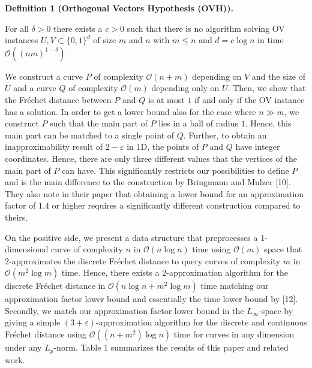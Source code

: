 \documentclass[10pt,a4paper]{article}
\begin{document}
\par
\par
\par\medskip\noindent\textbf{Definition 1 (Orthogonal Vectors Hypothesis (OVH)).}\par
For all $\delta>0$ there exists a $c>0$ such that there is no algorithm solving OV instances $U,V\subset\{0,1\}^{d}$ of size $m$ and $n$ with $m\leq n$ and $d=c\log n$ in time $\mathcal{O}((nm)^{1-\delta})$.
\par
\par
\par
We construct a curve $P$ of complexity $\mathcal{O}(n+m)$ depending on $V$ and the size of $U$ and a curve $Q$ of complexity $\mathcal{O}(m)$ depending only on $U$. Then, we show that the Fréchet distance between $P$ and $Q$ is at most $1$ if and only if the OV instance has a solution. In order to get a lower bound also for the case where $n\gg m$, we construct $P$ such that the main part of $P$ lies in a ball of radius $1$. Hence, this main part can be matched to a single point of $Q$. Further, to obtain an inapproximability result of $2-\varepsilon$ in 1D, the points of $P$ and $Q$ have integer coordinates. Hence, there are only three different values that the vertices of the main part of $P$ can have. This significantly restricts our possibilities to define $P$ and is the main difference to the construction by Bringmann and Mulzer [10]. They also note in their paper that obtaining a lower bound for an approximation factor of $1.4$ or higher requires a significantly different construction compared to theirs.
\par
\par
On the positive side, we present a data structure that preprocesses a 1-dimensional curve of complexity $n$ in $\mathcal{O}(n\log n)$ time using $\mathcal{O}(m)$ space that $2$-approximates the discrete Fréchet distance to query curves of complexity $m$ in $\mathcal{O}(m^{2}\log m)$ time. Hence, there exists a $2$-approximation algorithm for the discrete Fréchet distance in $\mathcal{O}(n\log n+m^{2}\log m)$ time matching our approximation factor lower bound and essentially the time lower bound by [12]. Secondly, we match our approximation factor lower bound in the $L_{\infty}$-space by giving a simple $(3+\varepsilon)$-approximation algorithm for the discrete and continuous Fréchet distance using $\mathcal{O}((n+m^{2})\log n)$ time for curves in any dimension under any $L_{p}$-norm. Table 1 summarizes the results of this paper and related work.
\end{document}
